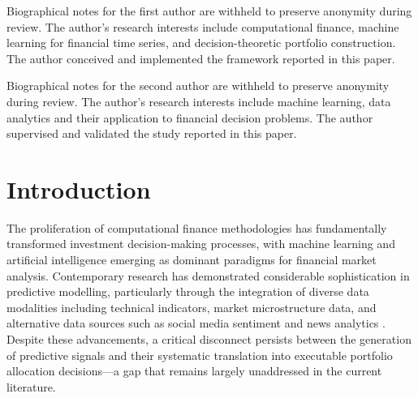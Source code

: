\documentclass{singlecol-new}
\theoremstyle{TH}{
\newtheorem{lemma}{Lemma}
\newtheorem{theorem}[lemma]{Theorem}
\newtheorem{corrolary}[lemma]{Corrolary}
\newtheorem{conjecture}[lemma]{Conjecture}
\newtheorem{proposition}[lemma]{Proposition}
\newtheorem{claim}[lemma]{Claim}
\newtheorem{stheorem}[lemma]{Wrong Theorem}
\newtheorem{algorithm}{Algorithm}
}
\theoremstyle{THrm}{
\newtheorem{definition}{Definition}[section]
\newtheorem{question}{Question}[section]
\newtheorem{remark}{Remark}
\newtheorem{scheme}{Scheme}
}
\theoremstyle{THhit}{
\newtheorem{case}{Case}[section]
}
\begin{document}

\begin{bio}
Biographical notes for the first author are withheld to preserve anonymity during
review. The author's research interests include computational finance, machine
learning for financial time series, and decision-theoretic portfolio construction.
The author conceived and implemented the framework reported in this
paper.

\noindent Biographical notes for the second author are withheld to preserve
anonymity during review. The author's research interests include machine learning,
data analytics and their application to financial decision problems. The author
supervised and validated the study reported in this
paper.
\end{bio}


\maketitle

\section{Introduction}
\label{sec:intro}

The proliferation of computational finance methodologies has fundamentally transformed
investment decision-making processes, with machine learning and artificial intelligence
emerging as dominant paradigms for financial market analysis. Contemporary research has
demonstrated considerable sophistication in predictive modelling, particularly through
the integration of diverse data modalities including technical indicators, market
microstructure data, and alternative data sources such as social media sentiment and
news analytics \citep{li20,zhang22}. Despite these advancements, a critical disconnect
persists between the generation of predictive signals and their systematic translation
into executable portfolio allocation decisions---a gap that remains largely unaddressed
in the current literature.
\end{document}
